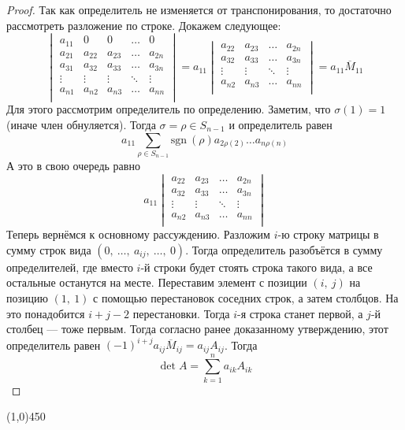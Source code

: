 \documentclass[a4paper,12pt]{article}
\newcommand{\sgn}{\mathrm{sgn\:}}
\begin{document}
	\begin{proof}
		Так как определитель не изменяется от транспонирования, то достаточно рассмотреть разложение по строке.
		Докажем следующее:
		\[\begin{vmatrix}
		a_{11} & 0 & 0 & \ldots & 0 \\
		a_{21} & a_{22} & a_{23} & \ldots & a_{2n} \\
		a_{31} & a_{32} & a_{33} & \ldots & a_{3n} \\
		\vdots & \vdots & \vdots & \ddots & \vdots \\
		a_{n1} & a_{n2} & a_{n3} & \ldots & a_{nn} \\
		\end{vmatrix} = a_{11}
		\begin{vmatrix}
		a_{22} & a_{23} & \ldots & a_{2n} \\
		a_{32} & a_{33} & \ldots & a_{3n} \\
		\vdots & \vdots & \ddots & \vdots \\
		a_{n2} & a_{n3} & \ldots & a_{nn} \\
		\end{vmatrix} = a_{11}\overline{M}_{11}\]
		Для этого рассмотрим определитель по определению. Заметим, что $\sigma(1) = 1$ (иначе член обнуляется). Тогда $\sigma = \rho \in S_{n-1}$ и определитель равен \[a_{11}\sum\limits_{\rho \in S_{n-1}} \sgn(\rho)a_{2\rho(2)}\ldots a_{n\rho(n)}\] А это в свою очередь равно
		\[a_{11}\begin{vmatrix}
		a_{22} & a_{23} & \ldots & a_{2n} \\
		a_{32} & a_{33} & \ldots & a_{3n} \\
		\vdots & \vdots & \ddots & \vdots \\
		a_{n2} & a_{n3} & \ldots & a_{nn} \\
		\end{vmatrix}\]
		Теперь вернёмся к основному рассуждению. Разложим $i$-ю строку матрицы в сумму строк вида $(0,\ \ldots,\ a_{ij},\ \ldots,\ 0)$. Тогда определитель разобъётся в сумму определителей, где вместо $i$-й строки будет стоять строка такого вида, а все остальные останутся на месте. Переставим элемент с позиции $(i,\ j)$ на позицию $(1,\ 1)$ с помощью перестановок соседних строк, а затем столбцов. На это понадобится $i+j-2$ перестановки. Тогда $i$-я строка станет первой, а $j$-й столбец --- тоже первым. Тогда согласно ранее доказанному утверждению, этот определитель равен $(-1)^{i+j}a_{ij}\overline{M}_{ij} = a_{ij}A_{ij}$. Тогда \[\det{A} = \sum_{k = 1}^{n} a_{ik}A_{ik}\]
	\end{proof}
	\begin{center}
		\line(1,0){450}
	\end{center}
\end{document}
